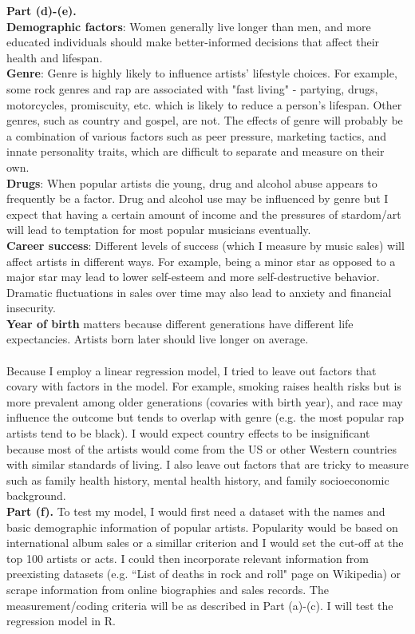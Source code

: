 \documentclass[letterpaper,12pt]{article}
\theoremstyle{definition}
\begin{document}
\noindent
\textbf {Part (d)-(e).}\\
\noindent
\textbf{Demographic factors}: Women generally live longer than men, and more educated individuals should make better-informed decisions that affect their health and lifespan. \\
\textbf{Genre}: Genre is highly likely to influence artists' lifestyle choices. For example, some rock genres and rap are associated with "fast living" - partying, drugs, motorcycles, promiscuity, etc. which is likely to reduce a person's lifespan. Other genres, such as country and gospel, are not. The effects of genre will probably be a combination of various factors such as peer pressure, marketing tactics, and innate personality traits, which are difficult to separate and measure on their own. \\
\textbf{Drugs}: When popular artists die young, drug and alcohol abuse appears to frequently be a factor. Drug and alcohol use may be influenced by genre but I expect that having a certain amount of income and the pressures of stardom/art will lead to temptation for most popular musicians eventually.\\
\textbf{Career success}: Different levels of success (which I measure by music sales) will affect artists in different ways. For example, being a minor star as opposed to a major star may lead to lower self-esteem and more self-destructive behavior. Dramatic fluctuations in sales over time may also lead to anxiety and financial insecurity. \\
\textbf{Year of birth} matters because different generations have different life expectancies. Artists born later should live longer on average.\\
\\
Because I employ a linear regression model, I tried to leave out factors that covary with factors in the model. For example, smoking raises health risks but is more prevalent among older generations (covaries with birth year), and race may influence the outcome but tends to overlap with genre (e.g. the most popular rap artists tend to be black). I would expect country effects to be insignificant because most of the artists would come from the US or other Western countries with similar standards of living. I also leave out factors that are tricky to measure such as family health history, mental health history, and family socioeconomic background.\\

\noindent
\textbf {Part (f).}
To test my model, I would first need a dataset with the names and basic demographic information of popular artists. Popularity would be based on international album sales or a simillar criterion and I would set the cut-off at the top 100 artists or acts. I could then incorporate relevant information from preexisting datasets (e.g. ``List of deaths in rock and roll" page on Wikipedia) or scrape information from online biographies and sales records. The measurement/coding criteria will be as described in Part (a)-(c). I will test the regression model in R.
\end{document}
